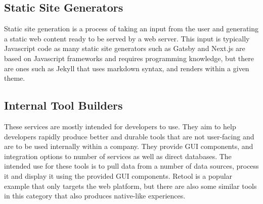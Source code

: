\subsection{Static Site Generators}

Static site generation is a process of taking an input from the user and generating a static web content ready to be served by a web server. This input is typically Javascript code as many static site generators such as Gatsby \cite{Gatsby} and Next.js \cite{Nextjs} are based on Javascript frameworks and requires programming knowledge, but there are ones such as Jekyll \cite{Jekyll} that uses markdown syntax, and renders within a given theme.

\subsection{Internal Tool Builders}

These services are mostly intended for developers to use. They aim to help developers rapidly produce better and durable tools that are not user-facing and are to be used internally within a company. They provide GUI components, and integration options to number of services as well as direct databases. The intended use for these tools is to pull data from a number of data sources, process it and display it using the provided GUI components. Retool \cite{Retool} is a popular example that only targets the web platform, but there are also some similar tools in this category that also produces native-like experiences.